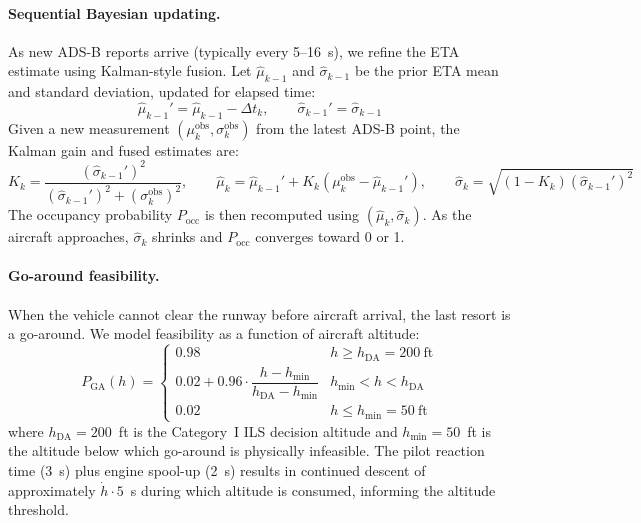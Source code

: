 \documentclass[11pt,a4paper]{article}
\begin{document}
\paragraph{Sequential Bayesian updating.}
As new ADS-B reports arrive (typically every 5--16~s), we refine the ETA estimate using Kalman-style fusion.
Let $\hat{\mu}_{k-1}$ and $\hat{\sigma}_{k-1}$ be the prior ETA mean and standard deviation, updated for elapsed time:
\begin{equation}
    \hat{\mu}_{k-1}' = \hat{\mu}_{k-1} - \Delta t_k, \qquad \hat{\sigma}_{k-1}' = \hat{\sigma}_{k-1}
\end{equation}
Given a new measurement $(\mu_k^{\mathrm{obs}}, \sigma_k^{\mathrm{obs}})$ from the latest ADS-B point, the Kalman gain and fused estimates are:
\begin{equation}
    K_k = \frac{(\hat{\sigma}_{k-1}')^2}{(\hat{\sigma}_{k-1}')^2 + (\sigma_k^{\mathrm{obs}})^2}, \qquad
    \hat{\mu}_k = \hat{\mu}_{k-1}' + K_k (\mu_k^{\mathrm{obs}} - \hat{\mu}_{k-1}'), \qquad
    \hat{\sigma}_k = \sqrt{(1 - K_k)(\hat{\sigma}_{k-1}')^2}
    \label{eq:kalman}
\end{equation}
The occupancy probability $P_{\mathrm{occ}}$ is then recomputed using $(\hat{\mu}_k, \hat{\sigma}_k)$.
As the aircraft approaches, $\hat{\sigma}_k$ shrinks and $P_{\mathrm{occ}}$ converges toward 0 or 1.

\paragraph{Go-around feasibility.}
When the vehicle cannot clear the runway before aircraft arrival, the last resort is a go-around.
We model feasibility as a function of aircraft altitude:
\begin{equation}
    P_{\mathrm{GA}}(h) = \begin{cases}
        0.98 & h \geq h_{\mathrm{DA}} = 200~\mathrm{ft} \\[4pt]
        0.02 + 0.96 \cdot \dfrac{h - h_{\min}}{h_{\mathrm{DA}} - h_{\min}} & h_{\min} < h < h_{\mathrm{DA}} \\[6pt]
        0.02 & h \leq h_{\min} = 50~\mathrm{ft}
    \end{cases}
    \label{eq:goaround}
\end{equation}
where $h_{\mathrm{DA}} = 200$~ft is the Category~I ILS decision altitude and $h_{\min} = 50$~ft is the altitude below which go-around is physically infeasible.
The pilot reaction time (3~s) plus engine spool-up (2~s) results in continued descent of approximately $\dot{h} \cdot 5$~s during which altitude is consumed, informing the altitude threshold.
\end{document}
